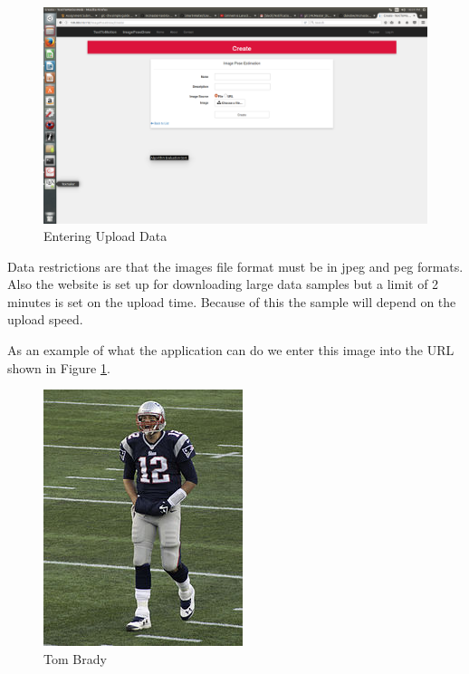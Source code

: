 \documentclass{scrreprt}
\begin{document}
\begin{figure}
  \includegraphics[width=\linewidth]{greenButtonPage.png}
  \caption{Entering Upload Data}
  \label{fig:uploadPage}
\end{figure}

Data restrictions are that the images file format must be in jpeg and peg formats.  Also the website is set up for downloading large data samples but a limit of 2 minutes is set on the upload time.  Because of this the sample will depend on the upload speed.

As an example of what the application can do we enter this image into the URL shown in Figure \ref{fig:uploadPage}.

\begin{figure}
  \includegraphics[width=\linewidth]{tbrady.jpg}
  \caption{Tom Brady}
  \label{fig:tomBrady}
\end{figure}
\end{document}
